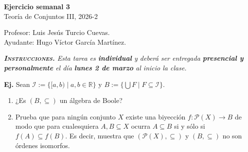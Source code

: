 \documentclass[letterpaper,DIV=15,12pt]{scrartcl}
\newcounter{Ejer}
\newcommand{\pts}{}
\newenvironment{ejercicio}[1]{\noindent
        \ifthenelse{\equal{#1}{1}}{\renewcommand{\pts}{\textbf{(#1 pt)}}}{\renewcommand{\pts}{\textbf{(#1 pts)}}}\textbf{Ej. \theEjer} \pts\stepcounter{Ejer}}{}
\begin{document}
\thispagestyle{plain}

       \begin{center}
            {\fontsize{30}{60}\rmfamily \textbf{Ejercicio semanal 3}} \\ \vspace{.2cm} Teoría de Conjuntos III, 2026-2
       \end{center}
        \begin{flushright}
            \footnotesize \hfill Profesor: Luis Jesús Turcio Cuevas.\\
            \hfill Ayudante: Hugo Víctor García Martínez.
        \end{flushright}
   
       \textit{\textbf{\textsc{Instrucciones.}} Esta tarea es \textbf{individual} y deberá ser entregada \textbf{presencial y personalmente} el día \textbf{lunes 2 de marzo} al inicio la clase.}\vspace{.3cm}

    \begin{ejercicio}{10}
        Sean $\mathscr{I}:=\{ [a,b) \mid a,b \in \mathbb{R} \}$ y $B:=\{ \bigcup F \mid F \subseteq \mathscr{I} \}$.
        \begin{enumerate}
          \item ¿Es $(B,\subseteq)$ un álgebra de Boole?
          \item Prueba que para ningún conjunto $X$ existe una biyección $f:\mathscr{P}(X) \to B$ de modo que para cualesquiera $A,B \subseteq X$ ocurra $A \subseteq B$ si y sólo si $f(A) \subseteq f(B)$. Es decir, muestra que $(\mathscr{P}(X),\subseteq)$ y $(B,\subseteq)$ no son órdenes isomorfos.
        \end{enumerate}
    \end{ejercicio}
\end{document}
